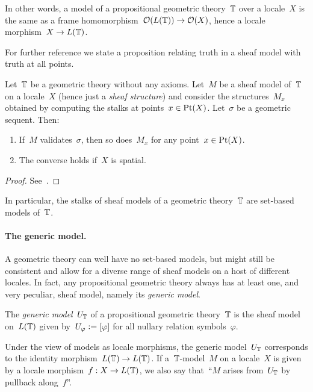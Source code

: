 \documentclass{ws-rv9x6}
\begin{document}
{In other words, a model of a propositional geometric theory~$\mathbb{T}$ over a
locale~$X$ is the same as a frame homomorphism~$\mathcal{O}(L(\mathbb{T})) \to \mathcal{O}(X)$, hence a
locale morphism~$X \to L(\mathbb{T})$.

For further reference we state a proposition relating truth in a sheaf model
with truth at all points.

\begin{proposition}\label{prop:at-points}
Let~$\mathbb{T}$ be a geometric theory without any axioms. Let~$M$ be a sheaf model
of~$\mathbb{T}$ on a locale~$X$ (hence just a \emph{sheaf structure}) and consider
the structures~$M_x$ obtained by computing the stalks at points~$x \in \mathrm{Pt}(X)$.
Let~$\sigma$ be a geometric sequent.
Then:
\begin{enumerate}
\item If~$M$ validates~$\sigma$, then so does~$M_x$ for any point~$x \in \mathrm{Pt}(X)$.
\item The converse holds if~$X$ is spatial.
\end{enumerate}
\end{proposition}

\begin{proof}See~\cite[Corollary~D1.2.14(ii)]{johnstone:elephant}.\end{proof}

In particular, the stalks of sheaf models of a geometric theory~$\mathbb{T}$ are
set-based models of~$\mathbb{T}$.

\paragraph{The generic model.}
A geometric theory can well have no set-based models, but might still be
consistent and allow for a diverse range of sheaf models on a host of different
locales. In fact, any propositional geometric theory always has at least one,
and very peculiar, sheaf model, namely its \emph{generic model}.

\begin{definition}The \emph{generic model}~$U_{\mathbb{T}}$ of a propositional geometric
theory~$\mathbb{T}$ is the sheaf model on~$L(\mathbb{T})$ given by~$U_\varphi \vcentcolon=
[\varphi]$ for all nullary relation symbols~$\varphi$.\end{definition}

Under the view of models as locale morphisms, the generic model~$U_{\mathbb{T}}$
corresponds to the identity morphism~$L(\mathbb{T}) \to L(\mathbb{T})$. If a~$\mathbb{T}$-model~$M$ on
a locale~$X$ is given by a locale morphism~$f : X \to L(\mathbb{T})$, we also say
that~``$M$ arises from~$U_{\mathbb{T}}$ by pullback along~$f$''.

}
\end{document}
